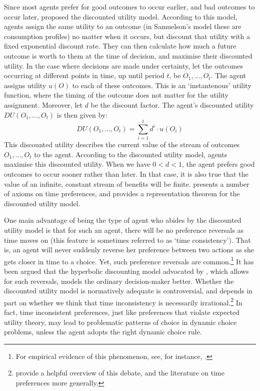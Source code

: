 Since most agents prefer for good outcomes to occur earlier, and bad outcomes to occur later, \citet{Samuelson1937} proposed the discounted utility model. According to this model, agents assign the same utility to an outcome (in Samuelson's model these are consumption profiles) no matter when it occurs, but discount that utility with a fixed exponential discount rate. They can then calculate how much a future outcome is worth to them at the time of decision, and maximise their discounted utility. In the case where decisions are made under certainty, let the outcomes occurring at different points in time, up until period $t$, be $O_1, ..., O_t$. The agent assigns utility $u(O)$ to each of these outcomes. This is an `instantenous' utility function, where the timing of the outcome does not matter for the utility assignment. Moreover, let $d$ be the discount factor. The agent's discounted utility $DU(O_1, ..., O_t)$ is then given by:
$$DU(O_1, ..., O_t) = \sum\limits_{i=1}^t d^i \cdot u (O_{i})$$
This discounted utility describes the current value of the stream of outcomes $O_1, ..., O_t$ to the agent. According to the discounted utility model, agents maximise this discounted utility. When we have $0 < d < 1$, the agent prefers good outcomes to occur sooner rather than later. In that case, it is also true that the value of an infinite, constant stream of benefits will be finite. \citet{Koopmans1960} presents a number of axioms on time preferences, and provides a representation theorem for the discounted utility model.

One main advantage of being the type of agent who abides by the discounted utility model is that for such an agent, there will be no preference reversals as time moves on (this feature is sometimes referred to as `time consistency'). That is, an agent will never suddenly reverse her preference between two actions as she gets closer in time to a choice. Yet, such preference reversals are common.\footnote{For empirical evidence of this phenomenon, see, for instance, \citet{Thaler1981}.} It has been argued that the hyperbolic discounting model advocated by \citet{Ainslie1992}, which allows for such reversals, models the ordinary decision-maker better. Whether the discounted utility model is normatively adequate is controversial, and depends in part on whether we think that time inconsistency is necessarily irrational.\footnote{\citet{Fredericketal2002} provide a helpful overview of this debate, and the literature on time preferences more generally.} In fact, time inconsistent preferences, just like preferences that violate expected utility theory, may lead to problematic patterns of choice in dynamic choice problems, unless the agent adopts the right dynamic choice rule.

